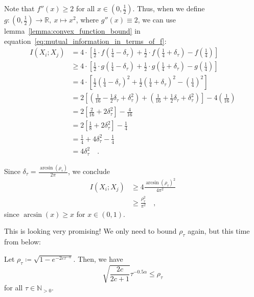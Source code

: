 \documentclass[../../main.tex]{subfiles}
\begin{document}
Note that $f''(x) \geq 2$ for all $x \in (0, \frac{1}{2})$. Thus, when we define $g: (0, \frac{1}{2}) \to \mathbb{R}, \ x \mapsto x^2$, where $g''(x) \equiv 2$, we can use lemma~\ref{lemma:convex_function_bound} in equation~\eqref{eq:mutual_information_in_terms_of_f}:
\begin{align*}
    I(X_i; X_j) &= 4 \cdot \left[ \frac{1}{2} \cdot f(\frac{1}{4} - \delta_\tau) + \frac{1}{2} \cdot f(\frac{1}{4} + \delta_\tau) - f(\frac{1}{4}) \right] \\
    &\geq 4 \cdot \left[ \frac{1}{2} \cdot g(\frac{1}{4} - \delta_\tau) + \frac{1}{2} \cdot g(\frac{1}{4} + \delta_\tau) - g(\frac{1}{4}) \right] \\
    &= 4 \cdot \left[ \frac{1}{2} \left(\frac{1}{4} - \delta_\tau\right)^2 + \frac{1}{2} \left(\frac{1}{4} + \delta_\tau\right)^2 - \left(\frac{1}{4}\right)^2 \right] \\
    &= 2 \left[ \left(\frac{1}{16} - \frac{1}{2}\delta_\tau + \delta_\tau^2\right) + \left(\frac{1}{16} + \frac{1}{2}\delta_\tau + \delta_\tau^2\right) \right] - 4\left(\frac{1}{16}\right) \\
    &= 2 \left[ \frac{2}{16} + 2\delta_\tau^2 \right] - \frac{4}{16} \\
    &= 2 \left[ \frac{1}{8} + 2\delta_\tau^2 \right] - \frac{1}{4} \\
    &= \frac{1}{4} + 4\delta_\tau^2 - \frac{1}{4} \\
    &= 4\delta_\tau^2 \quad .
\end{align*}

Since $\delta_\tau = \frac{\arcsin(\rho_\tau)}{2\pi}$, we conclude
\begin{align*}
    I(X_i; X_j) &\geq 4 \frac{\arcsin(\rho_\tau)^2}{4\pi^2} \\
    &\geq \frac{\rho_\tau^2}{\pi^2} \quad ,
\end{align*}
since $\arcsin(x) \geq x$ for $x \in (0, 1)$.

This is looking very promising! We only need to bound $\rho_\tau$ again, but this time from below:

\begin{lemma}
    \label{lemma:bounding_rho}
    Let $\rho_\tau \coloneqq \sqrt{1 - e^{-2c \tau^{-\alpha}}}$. Then, we have
    \[
        \sqrt{\frac{2c}{2c + 1}} \tau^{-0.5 \alpha} \leq \rho_\tau
    \]
    for all $\tau \in \mathbb{N}_{>0}$.
\end{lemma}
\end{document}
